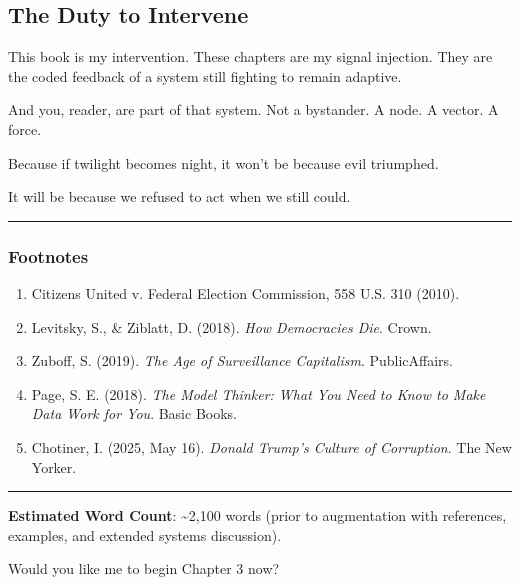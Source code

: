 \subsection{The Duty to Intervene}\label{the-duty-to-intervene}

This book is my intervention. These chapters are my signal injection.
They are the coded feedback of a system still fighting to remain
adaptive.

And you, reader, are part of that system. Not a bystander. A node. A
vector. A force.

Because if twilight becomes night, it won't be because evil triumphed.

It will be because we refused to act when we still could.

\begin{center}\rule{0.5\linewidth}{0.5pt}\end{center}

\subsubsection{Footnotes}\label{footnotes}

\begin{enumerate}
\def\labelenumi{\arabic{enumi}.}
\tightlist
\item
  Citizens United v. Federal Election Commission, 558 U.S. 310 (2010).
\item
  Levitsky, S., \& Ziblatt, D. (2018). \emph{How Democracies Die}.
  Crown.
\item
  Zuboff, S. (2019). \emph{The Age of Surveillance Capitalism}.
  PublicAffairs.
\item
  Page, S. E. (2018). \emph{The Model Thinker: What You Need to Know to
  Make Data Work for You}. Basic Books.
\item
  Chotiner, I. (2025, May 16). \emph{Donald Trump's Culture of
  Corruption}. The New Yorker.
\end{enumerate}

\begin{center}\rule{0.5\linewidth}{0.5pt}\end{center}

\textbf{Estimated Word Count}: \textasciitilde2,100 words (prior to
augmentation with references, examples, and extended systems
discussion).

Would you like me to begin Chapter 3 now?
